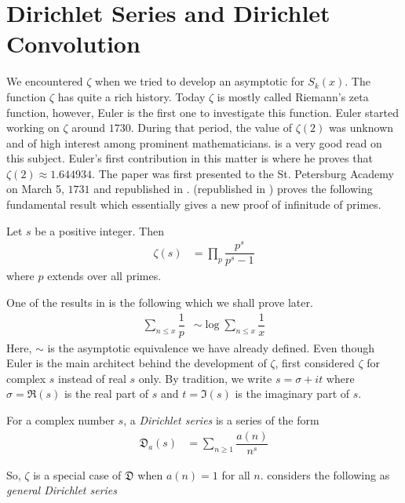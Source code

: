 \documentclass[elemannt.tex]{subfile}
\begin{document}
	\section{Dirichlet Series and Dirichlet Convolution}\label{sec:zeta}
	We encountered $\zeta$ when we tried to develop an asymptotic for $S_{k}(x)$. The function $\zeta$ has quite a rich history. Today $\zeta$ is mostly called Riemann's zeta function, however, Euler is the first one to investigate this function. Euler started working on $\zeta$ around $1730$. During that period, the value of $\zeta(2)$ was unknown and of high interest among prominent mathematicians. \textcite{ayoub_1974} is a very good read on this subject. Euler's first contribution in this matter is \textcite{euler_1738} where he proves that $\zeta(2)\approx 1.644934$. The paper was first presented to the St. Petersburg Academy on March 5, $1731$ and republished in \textcite{euler_2020_a}. \textcite{euler_1744} (republished in \textcite{euler_2020_b}) proves the following fundamental result which essentially gives a new proof of infinitude of primes.
		\begin{theorem}
			Let $s$ be a positive integer. Then
				\begin{align*}
					\zeta(s)
						& = \prod_{p}\dfrac{p^{s}}{p^{s}-1}
				\end{align*}
			where $p$ extends over all primes.
		\end{theorem}
	One of the results in \textcite{euler_1744} is the following which we shall prove later.
		\begin{align*}
			\sum_{n\leq x}\dfrac{1}{p}
			& \sim \log{\sum_{n\leq x}\dfrac{1}{x}}
		\end{align*}
	Here, $\sim$ is the asymptotic equivalence we have already defined. Even though Euler is the main architect behind the development of $\zeta$, \textcite{riemann_1859} first considered $\zeta$ for complex $s$ instead of real $s$ only. By tradition, we write $s=\sigma+it$ where $\sigma=\Re(s)$ is the real part of $s$ and $t=\Im(s)$ is the imaginary part of $s$.
		\begin{definition}
			For a complex number $s$, a \textit{Dirichlet series} is a series of the form
				\begin{align*}
					\mathfrak{D}_{a}(s)
						& = \sum_{n\geq 1}\dfrac{a(n)}{n^{s}}
				\end{align*}
		\end{definition}
	So, $\zeta$ is a special case of $\mathfrak{D}$ when $a(n)=1$ for all $n$. \textcite[$\S1$, Page $1$]{hardy_riesz_1915} considers the following as \textit{general Dirichlet series}
\end{document}

